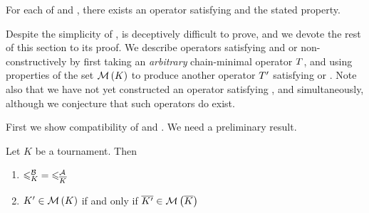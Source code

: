\begin{theorem}
    \label{tourn_result_chainmin_axiom_compatibilities}

    For each of \dualaxiom{} and \mon{}, there exists an operator
    satisfying \chainmin{} and the stated property.

\end{theorem}

Despite the simplicity of \mon{},
 is deceptively difficult to
prove, and we devote the rest of this section to its proof. We describe
operators satisfying \chaindef{} and \dualaxiom{} or \mon{}
non-constructively by first taking an \emph{arbitrary} chain-minimal operator
$T$, and using properties of the set $\operatorname{\mathcal{M}}\left({K}\right)$ to produce another operator
$T'$ satisfying \dualaxiom{} or \mon{}. Note also that we have
not yet constructed an operator satisfying \dualaxiom{}, \mon{} and
\chainmin{} simultaneously, although we conjecture that such operators
do exist.

First we show compatibility of \chainmin{} and \dualaxiom{}. We
need a preliminary result.

\begin{lemma}
    \label{tourn_result_chainmin_dual_lemma}
    Let $K$ be a tournament. Then
    \begin{enumerate}
        \item ${\leqslant^{\mathcal{B}}_K} = {\leqslant^{\mathcal{A}}_{{\overline{K}}}}$ \label{tourn_item_dual_lemma_nle}
        \item $K' \in \operatorname{\mathcal{M}}\left({K}\right)$ if and only if ${\overline{K'}} \in
              \operatorname{\mathcal{M}}\left({{\overline{K}}}\right)$
              \label{tourn_item_dual_lemma_minch}
    \end{enumerate}
\end{lemma}

